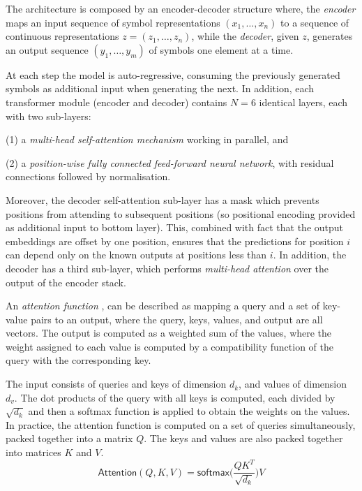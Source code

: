 \documentclass{article}
\begin{document}
	The architecture is composed by an encoder-decoder structure where, the \textit{encoder} maps an 
	input sequence of symbol representations $(x_1,\dots, x_n)$ to a sequence of continuous 
	representations $z = (z_1, \dots, z_n)$, while the  \textit{decoder}, given $z$, generates an 
	output sequence $(y_1, \dots, y_m)$ of symbols one element at a time. 
	
	At each step the model is auto-regressive, consuming the previously generated symbols as 
	additional input when generating the next.
	In addition, each transformer module (encoder and decoder) contains $N=6$ identical layers, each 
	with two sub-layers:
		\begin{enumerate*}
			\item[(1)] a \textit{multi-head self-attention mechanism} working in parallel, and 
			\item[(2)] a \textit{position-wise fully connected feed-forward neural network}, with residual 
			connections followed by normalisation.
	\end{enumerate*}
	Moreover, the decoder self-attention sub-layer has a mask which prevents positions from attending 
	to subsequent positions (so positional encoding provided as additional input to bottom layer). This, 
	combined with fact that the output embeddings are offset by one position, ensures that the 
	predictions for position $i$ can depend only on the known outputs at positions less than $i$.
 	In addition, the decoder has a third sub-layer, which performs \textit{multi-head attention} over the 
 	output of the encoder stack. 
	
	An \textit{attention function} \cite{vaswani2017attention}, can be described as mapping a query and 
	a set of key-value pairs to an output, where the query, keys, values, and output are all vectors. The 
	output is computed as a weighted sum of the values, where the weight assigned to each value is 
	computed by a compatibility function of the query with the corresponding key.

	The input consists of queries and keys of dimension $d_k$, and values of dimension $d_v$. The dot 
	products of the query with all keys is computed, each divided by $\sqrt{d_k}$ and then a 
	softmax function is applied to obtain the weights on the values.
	In practice, the attention function is computed on a set of queries simultaneously, packed together 
	into a matrix $Q$. The keys and values are also packed together into matrices $K$ and $V$. 
	\begin{equation}
		\label{eqn:attention}
		\mathsf{Attention}(Q, K, V) = \mathsf{softmax} \big( \frac{QK^T}{\sqrt{d_k}}\big)V
	\end{equation}
	
\end{document}
